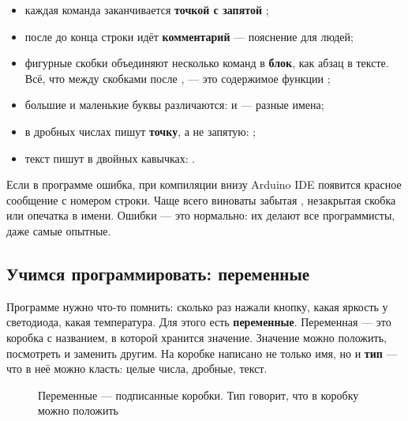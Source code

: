 \begin{itemize}
  \item каждая команда заканчивается \textbf{точкой с запятой} \code{;};
  \item после \code{//} до конца строки идёт \textbf{комментарий} --- пояснение для людей;
  \item фигурные скобки \code{\{ \}} объединяют несколько команд в \textbf{блок}, как абзац в тексте.
        Всё, что между скобками после , --- это содержимое функции ;
  \item большие и маленькие буквы различаются:  и  --- разные имена;
  \item в дробных числах пишут \textbf{точку}, а не запятую: ;
  \item текст пишут в двойных кавычках: .
\end{itemize}

\begin{tip}
Если в программе ошибка, при компиляции внизу Arduino IDE появится красное сообщение с номером строки.
Чаще всего виноваты забытая \code{;}, незакрытая скобка или опечатка в имени. Ошибки --- это нормально:
их делают все программисты, даже самые опытные.
\end{tip}

\subsection{Учимся программировать: переменные}

Программе нужно что-то помнить: сколько раз нажали кнопку, какая яркость у светодиода, какая температура.
Для этого есть \textbf{переменные}. Переменная --- это коробка с названием, в которой хранится значение.
Значение можно положить, посмотреть и заменить другим. На коробке написано не только имя, но и
\textbf{тип} --- что в неё можно класть: целые числа, дробные, текст.

\begin{figure}[H]
\centering
{}
\caption{Переменные --- подписанные коробки. Тип говорит, что в коробку можно положить}
\end{figure}

